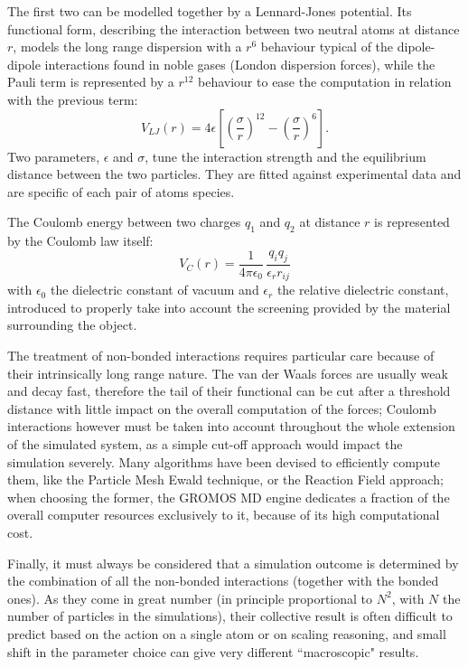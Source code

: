 The first two can be modelled together by a Lennard-Jones potential. Its functional form, describing the interaction between two neutral atoms at distance $r$, models the long range dispersion with a $r^6$ behaviour typical of the dipole-dipole interactions found in noble gases (London dispersion forces), while the Pauli term is represented by a $r^{12}$ behaviour to ease the computation in relation with the previous term:
\begin{equation}
V_{LJ}(r) = 4 \epsilon \left[ \left( \frac{\sigma}{r} \right)^{12} - \left( \frac{\sigma}{r} \right)^6 \right].
\end{equation}
Two parameters, $\epsilon$ and $\sigma$, tune the interaction strength and the equilibrium distance between the two particles. They are fitted against experimental data and are specific of each pair of atoms species.

The Coulomb energy between two charges $q_1$ and $q_2$ at distance $r$ is represented by the Coulomb law itself:
\begin{equation}
V_C(r) = \frac{1}{4 \pi \epsilon_0} \, \frac{q_i q_j}{\epsilon_r r_{ij}}
\end{equation}
with $\epsilon_0$ the dielectric constant of vacuum and $\epsilon_r$ the relative dielectric constant, introduced to properly take into account the screening provided by the material surrounding the object.

The treatment of non-bonded interactions requires particular care because of their intrinsically long range nature. The van der Waals forces are usually weak and decay fast, therefore the tail of their functional can be cut after a threshold distance with little impact on the overall computation of the forces; Coulomb interactions however must be taken into account throughout the whole extension of the simulated system, as a simple cut-off approach would impact the simulation severely. Many algorithms have been devised to efficiently compute them, like the Particle Mesh Ewald \cite{--} technique, or the Reaction Field \cite{--} approach; when choosing the former, the GROMOS MD engine dedicates a fraction of the overall computer resources exclusively to it, because of its high computational cost.

Finally, it must always be considered that a simulation outcome is determined by the combination of all the non-bonded interactions (together with the bonded ones). As they come in great number (in principle proportional to $N^2$, with $N$ the number of particles in the simulations), their collective result is often difficult to predict based on the action on a single atom or on scaling reasoning, and small shift in the parameter choice can give very different ``macroscopic" results.

